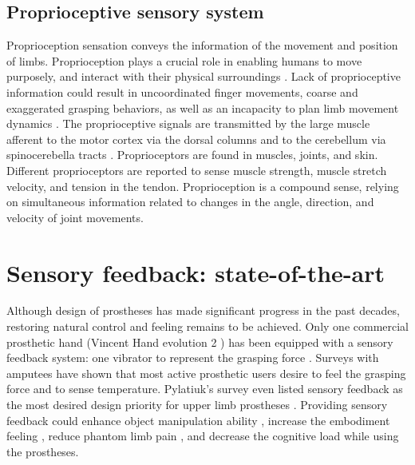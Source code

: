 \subsection{Proprioceptive sensory system}
Proprioception sensation conveys the information of the movement and position of limbs. Proprioception plays a crucial role in enabling humans to move purposely, and interact with their physical surroundings \cite{blank2010identifying}. Lack of proprioceptive information could result in uncoordinated finger movements, coarse and exaggerated grasping behaviors, as well as an incapacity to plan limb movement dynamics \cite{sainburg1995control}.
The proprioceptive signals are transmitted by the large muscle afferent to the motor cortex via the dorsal columns \cite{favorov1988functional} and to the cerebellum via spinocerebella tracts \cite{ekerot1979information}. 
Proprioceptors are found in muscles, joints, and skin. 
Different proprioceptors are reported to sense muscle strength, muscle stretch velocity, and tension in the tendon. Proprioception is a compound sense, relying on simultaneous information related to changes in the angle, direction, and velocity of joint movements.



\section{Sensory feedback: state-of-the-art}
Although design of prostheses has made significant progress in the past decades, restoring natural control and feeling remains to be achieved. 
Only one commercial prosthetic hand (Vincent Hand evolution 2 \cite{vincent_system_vincent_evoluation_2}) has been equipped with a sensory feedback system: one vibrator to represent the grasping force \cite{vincent_system_vincent_evoluation_2}.
Surveys with amputees have shown that most active prosthetic users desire to feel the grasping force and to sense temperature. Pylatiuk's survey even listed sensory feedback as the most desired design priority for upper limb prostheses \cite{pylatiuk2007results}. Providing sensory feedback could enhance object manipulation ability \cite{clemente2016non}, increase the embodiment feeling \cite{marasco2011robotic, mulvey2009use,collins2016ownership}, reduce phantom limb pain \cite{dietrich2012sensory, mulvey2013transcutaneous}, and decrease the cognitive load while using the prostheses\cite{svensson2017review, yamada2016investigation}. 

